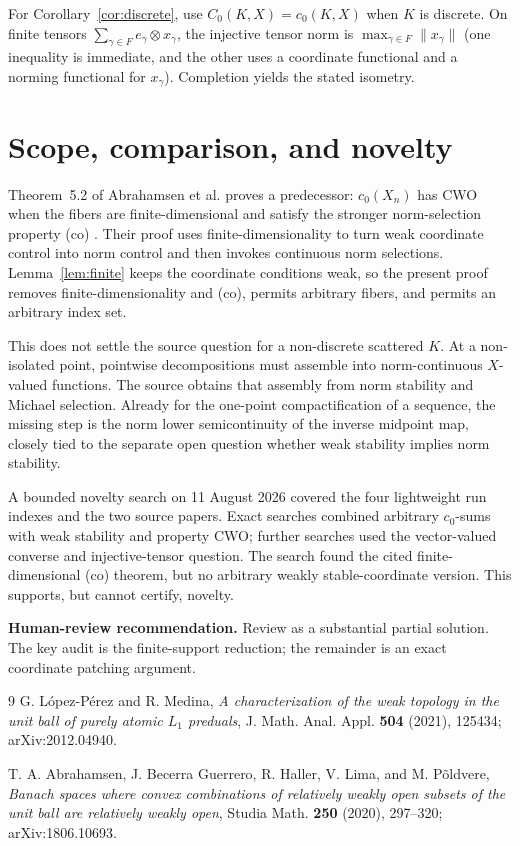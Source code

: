 \documentclass[11pt]{article}
\begin{document}
For Corollary~\ref{cor:discrete}, use
$C_0(K,X)=c_0(K,X)$ when $K$ is discrete.  On finite tensors
$\sum_{\gamma\in F}e_\gamma\otimes x_\gamma$, the injective tensor norm is
$\max_{\gamma\in F}\|x_\gamma\|$ (one inequality is immediate, and the other
uses a coordinate functional and a norming functional for $x_\gamma$).
Completion yields the stated isometry.

\section{Scope, comparison, and novelty}

Theorem~5.2 of Abrahamsen et al. proves a predecessor: $c_0(X_n)$ has CWO
when the fibers are finite-dimensional and satisfy the stronger norm-selection
property (co) \cite[Theorem~5.2]{Aetal}.  Their proof uses finite-dimensionality
to turn weak coordinate control into norm control and then invokes continuous
norm selections.  Lemma~\ref{lem:finite} keeps the coordinate conditions weak,
so the present proof removes finite-dimensionality and (co), permits arbitrary
fibers, and permits an arbitrary index set.

This does not settle the source question for a non-discrete scattered $K$.
At a non-isolated point, pointwise decompositions must assemble into
norm-continuous $X$-valued functions.  The source obtains that assembly from
norm stability and Michael selection.  Already for the one-point
compactification of a sequence, the missing step is the norm lower
semicontinuity of the inverse midpoint map, closely tied to the separate open
question whether weak stability implies norm stability.

A bounded novelty search on 11 August 2026 covered the four lightweight run
indexes and the two source papers.  Exact searches combined arbitrary
$c_0$-sums with weak stability and property CWO; further searches used the
vector-valued converse and injective-tensor question.  The search found the
cited finite-dimensional (co) theorem, but no arbitrary weakly
stable-coordinate version.  This supports, but cannot certify, novelty.

\textbf{Human-review recommendation.}  Review as a substantial partial
solution.  The key audit is the finite-support reduction; the remainder is an
exact coordinate patching argument.

\begin{thebibliography}{9}
G. L\'opez-P\'erez and R. Medina,
\emph{A characterization of the weak topology in the unit ball of purely
atomic $L_1$ preduals},
J. Math. Anal. Appl. \textbf{504} (2021), 125434;
arXiv:2012.04940.

T. A. Abrahamsen, J. Becerra Guerrero, R. Haller, V. Lima, and M. P\~oldvere,
\emph{Banach spaces where convex combinations of relatively weakly open
subsets of the unit ball are relatively weakly open},
Studia Math. \textbf{250} (2020), 297--320;
arXiv:1806.10693.
\end{thebibliography}
\end{document}
